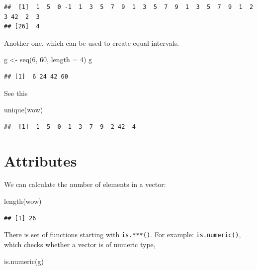 \documentclass[
]{book}
\newenvironment{Shaded}{\begin{snugshade}}{\end{snugshade}}
\newcommand{\AttributeTok}[1]{\textcolor[rgb]{0.77,0.63,0.00}{#1}}
\newcommand{\DecValTok}[1]{\textcolor[rgb]{0.00,0.00,0.81}{#1}}
\newcommand{\FunctionTok}[1]{\textcolor[rgb]{0.00,0.00,0.00}{#1}}
\newcommand{\NormalTok}[1]{#1}
\newcommand{\OtherTok}[1]{\textcolor[rgb]{0.56,0.35,0.01}{#1}}
\theoremstyle{definition}
\theoremstyle{definition}
\theoremstyle{definition}
\theoremstyle{definition}
\theoremstyle{remark}
\begin{document}
\begin{verbatim}
##  [1]  1  5  0 -1  1  3  5  7  9  1  3  5  7  9  1  3  5  7  9  1  2  3 42  2  3
## [26]  4
\end{verbatim}

Another one, which can be used to create equal intervals.

\begin{Shaded}
\begin{Highlighting}[]
\NormalTok{g }\OtherTok{\textless{}{-}} \FunctionTok{seq}\NormalTok{(}\DecValTok{6}\NormalTok{, }\DecValTok{60}\NormalTok{, }\AttributeTok{length =} \DecValTok{4}\NormalTok{)}
\NormalTok{g}
\end{Highlighting}
\end{Shaded}

\begin{verbatim}
## [1]  6 24 42 60
\end{verbatim}

See this

\begin{Shaded}
\begin{Highlighting}[]
\FunctionTok{unique}\NormalTok{(wow)}
\end{Highlighting}
\end{Shaded}

\begin{verbatim}
##  [1]  1  5  0 -1  3  7  9  2 42  4
\end{verbatim}

\hypertarget{attributes}{%
\section{Attributes}\label{attributes}}

We can calculate the number of elements in a vector:

\begin{Shaded}
\begin{Highlighting}[]
\FunctionTok{length}\NormalTok{(wow)}
\end{Highlighting}
\end{Shaded}

\begin{verbatim}
## [1] 26
\end{verbatim}

There is set of functions starting with \texttt{is.***()}. For example: \texttt{is.numeric()}, which checks whether a vector is of numeric type,

\begin{Shaded}
\begin{Highlighting}[]
\FunctionTok{is.numeric}\NormalTok{(g)}
\end{Highlighting}
\end{Shaded}
\end{document}
